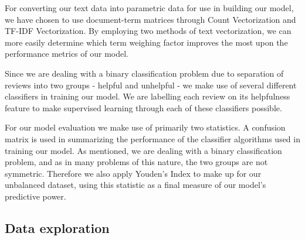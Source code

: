 \documentclass[twoside,twocolumn]{article}
\begin{document}
For converting our text data into parametric data for use in building our model, we have chosen to use document-term matrices through Count Vectorization and TF-IDF Vectorization. By employing two methods of text vectorization, we can more easily determine which term weighing factor improves the most upon the performance metrics of our model.

Since we are dealing with a binary classification problem due to separation of reviews into two groups - helpful and unhelpful - we make use of several different classifiers in training our model. We are labelling each review on its helpfulness feature to make supervised learning through each of these classifiers possible.

For our model evaluation we make use of primarily two statistics. A confusion matrix is used in summarizing the performance of the classifier algorithms used in training our model. As mentioned, we are dealing with a binary classification problem, and as in many problems of this nature, the two groups are not symmetric. Therefore we also apply Youden's Index to make up for our unbalanced dataset, using this statistic as a final measure of our model's predictive power.
\subsection{Data exploration}
\end{document}
